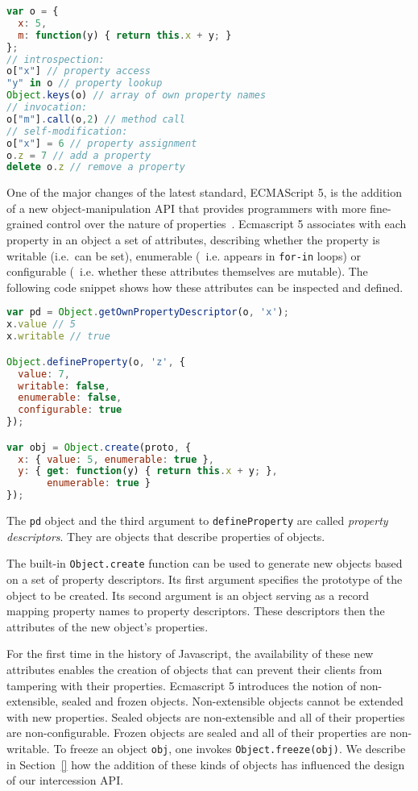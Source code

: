 \documentclass{acm_proc_article-sp}
\begin{document}
\begin{lstlisting}[language=javascript]
var o = {
  x: 5,
  m: function(y) { return this.x + y; }
};
// introspection:
o["x"] // property access
"y" in o // property lookup
Object.keys(o) // array of own property names
// invocation:
o["m"].call(o,2) // method call
// self-modification:
o["x"] = 6 // property assignment
o.z = 7 // add a property
delete o.z // remove a property
\end{lstlisting}

One of the major changes of the latest standard, ECMAScript 5, is the addition of a new object-manipulation API that provides programmers with more fine-grained control over the nature of properties~\cite{ecma262}. Ecmascript 5 associates with each property in an object a set of attributes, describing whether the property is writable (i.e.~can be set), enumerable (~i.e. appears in \texttt{for-in} loops) or configurable (~i.e. whether these attributes themselves are mutable). The following code snippet shows how these attributes can be inspected and defined.

\begin{lstlisting}[language=javascript]
var pd = Object.getOwnPropertyDescriptor(o, 'x');
x.value // 5
x.writable // true

Object.defineProperty(o, 'z', {
  value: 7,
  writable: false,
  enumerable: false,
  configurable: true
});

var obj = Object.create(proto, {
  x: { value: 5, enumerable: true },
  y: { get: function(y) { return this.x + y; },
       enumerable: true }
});
\end{lstlisting}

The \texttt{pd} object and the third argument to \texttt{defineProperty} are called \emph{property descriptors}. They are objects that describe properties of objects.

The built-in \texttt{Object.create} function can be used to generate new objects based on a set of property descriptors. Its first argument specifies the prototype of the object to be created. Its second argument is an object serving as a record mapping property names to property descriptors. These descriptors then the attributes of the new object's properties.

For the first time in the history of Javascript, the availability of these new attributes enables the creation of objects that can prevent their clients from tampering with their properties. Ecmascript 5 introduces the notion of non-extensible, sealed and frozen objects. Non-extensible objects cannot be extended with new properties. Sealed objects are non-extensible and all of their properties are non-configurable. Frozen objects are sealed and all of their properties are non-writable. To freeze an object \texttt{obj}, one invokes \texttt{Object.freeze(obj)}. We describe in Section~\ref{} how the addition of these kinds of objects has influenced the design of our intercession API.
\end{document}
